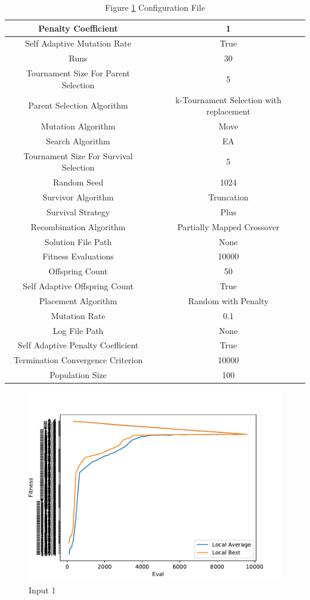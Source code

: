 \documentclass{standalone}
\begin{document}
\begin{table}[!htb]
	\centering
	\caption{Figure \ref{fig:graph_1024} Configuration File}
	\label{tab:graph_1024}
	\begin{tabular}{| c | c |}
		\hline
		Penalty Coefficient		& 1		 \\
		\hline
		Self Adaptive Mutation Rate		& True		 \\
		\hline
		Runs		& 30		 \\
		\hline
		Tournament Size For Parent Selection		& 5		 \\
		\hline
		Parent Selection Algorithm		& k-Tournament Selection with replacement		 \\
		\hline
		Mutation Algorithm		& Move		 \\
		\hline
		Search Algorithm		& EA		 \\
		\hline
		Tournament Size For Survival Selection		& 5		 \\
		\hline
		Random Seed		& 1024		 \\
		\hline
		Survivor Algorithm		& Truncation		 \\
		\hline
		Survival Strategy		& Plus		 \\
		\hline
		Recombination Algorithm		& Partially Mapped Crossover		 \\
		\hline
		Solution File Path		& None		 \\
		\hline
		Fitness Evaluations		& 10000		 \\
		\hline
		Offspring Count		& 50		 \\
		\hline
		Self Adaptive Offspring Count		& True		 \\
		\hline
		Placement Algorithm		& Random with Penalty		 \\
		\hline
		Mutation Rate		& 0.1		 \\
		\hline
		Log File Path		& None		 \\
		\hline
		Self Adaptive Penalty Coefficient		& True		 \\
		\hline
		Termination Convergence Criterion		& 10000		 \\
		\hline
		Population Size		& 100		 \\
		\hline
	\end{tabular}
\end{table}
\begin{figure}[!htb]
	\caption{Input 1}
	\label{fig:graph_1024}
	\includegraphics[width=\textwidth]{../graphs/graphs/1024.pdf}
\end{figure}
\end{document}
